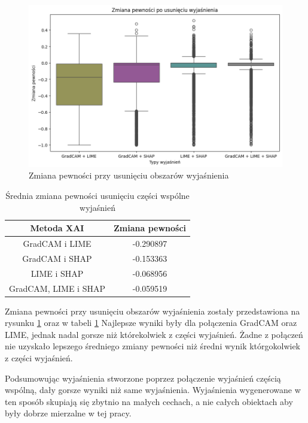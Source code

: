 \begin{figure}[h]
	\centering\includegraphics[width=.9\textwidth]{img/combine_confidence_no_exp_and}
	\caption{Zmiana pewności przy usunięciu obszarów wyjaśnienia}  \label{rys:combineandconfidenceandno}
\end{figure}
\begin{table}
	\centering
	\begin{tabular}{|c|c|}
		\hline
		\textbf{Metoda XAI}  & Zmiana pewności \\
		\hline
		GradCAM i LIME       & -0.290897       \\
		\hline
		GradCAM i SHAP       & -0.153363       \\
		\hline
		LIME i SHAP          & -0.068956       \\
		\hline
		GradCAM, LIME i SHAP & -0.059519       \\
		\hline
	\end{tabular}
	\caption{Średnia zmiana pewności usunięciu części wspólne wyjaśnień}
	\label{tab:combineandconfidenceandno}
\end{table}
Zmiana pewności przy usunięciu obszarów wyjaśnienia zostały przedstawiona na rysunku \ref{rys:combineandconfidenceandno} oraz w tabeli \ref{tab:combineandconfidenceandno}
Najlepsze wyniki były dla połączenia GradCAM oraz LIME, jednak nadal gorsze niż którekolwiek z części wyjaśnień.
Żadne z połączeń nie uzyskało lepszego średniego zmiany pewności niż średni wynik którgokolwiek z części wyjaśnień.

\vspace{1cm}
Podsumowując wyjaśnienia stworzone poprzez połączenie wyjaśnień częścią wspólną, dały gorsze wyniki niż same wyjaśnienia.
Wyjaśnienia wygenerowane w ten sposób skupiają się zbytnio na małych cechach, a nie całych obiektach aby były dobrze mierzalne w tej pracy.


